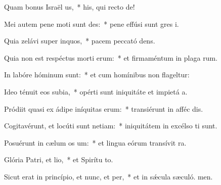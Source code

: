 \item Quam bonus Israël us,~* his, qui recto  de!
\item Mei autem pene moti sunt des:~* pene effúsi sunt gres i.
\item Quia zelávi super inquos,~* pacem peccató dens.
\item Quia non est respéctus morti erum:~* et firmaméntum in plaga rum.
\item In labóre hóminum  sunt:~* et cum homínibus non flageltur:
\item Ideo ténuit eos subia,~* opérti sunt iniquitáte et impietá a.
\item Pródiit quasi ex ádipe iníquitas erum:~* transiérunt in afféc dis.
\item Cogitavérunt, et locúti sunt netiam:~* iniquitátem in excélso ti sunt.
\item Posuérunt in cælum os um:~* et lingua eórum transívit  ra.
\item Glória Patri, et lio,~* et Spirítu to.
\item Sicut erat in princípio, et nunc, et per,~* et in sǽcula sæculó. men.

